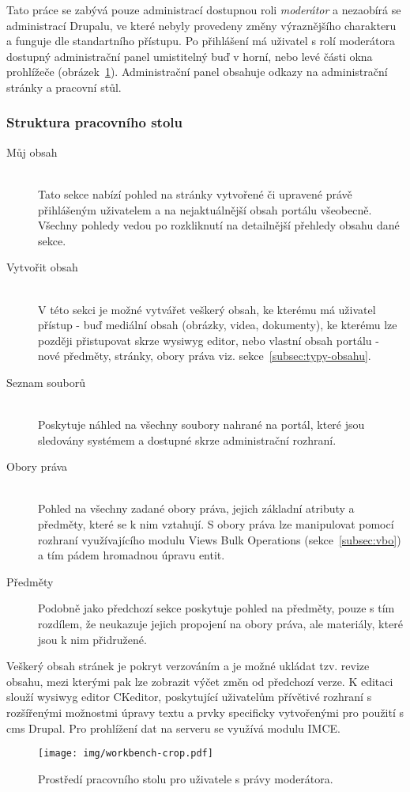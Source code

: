 Tato práce se zabývá pouze administrací dostupnou roli \emph{moderátor} a nezaobírá se administrací Drupalu, ve které nebyly provedeny změny výraznějšího charakteru a funguje dle standartního přístupu. Po přihlášení má uživatel s rolí moderátora dostupný administrační panel umistitelný buď v horní, nebo levé části okna prohlížeče (obrázek~\ref{fig:workbench}). Administrační panel obsahuje odkazy na administrační stránky a pracovní stůl. 

\subsubsection*{Struktura pracovního stolu}
\begin{description}
  \item[Můj obsah] \hfill \\
  Tato sekce nabízí pohled na stránky vytvořené či upravené právě přihlášeným uživatelem a na nejaktuálnější obsah portálu všeobecně. Všechny pohledy vedou po rozkliknutí na detailnější přehledy obsahu dané sekce.  
  \item [Vytvořit obsah] \hfill \\
  V této sekci je možné vytvářet veškerý obsah, ke kterému má uživatel přístup - buď mediální obsah (obrázky, videa, dokumenty), ke kterému lze později přistupovat skrze \gls{wysiwyg} editor, nebo vlastní obsah portálu - nové předměty, stránky, obory práva viz. sekce~\ref{subsec:typy-obsahu}.
  \item [Seznam souborů] \hfill \\
  Poskytuje náhled na všechny soubory nahrané na portál, které jsou sledovány systémem a dostupné skrze administrační rozhraní.
  \item [Obory práva] \hfill \\
  Pohled na všechny zadané obory práva, jejich základní atributy a předměty, které se k nim vztahují. S obory práva lze manipulovat pomocí rozhraní využívajícího modulu Views Bulk Operations (sekce~\ref{subsec:vbo}) a tím pádem hromadnou úpravu entit.
  \item [Předměty]
  Podobně jako předchozí sekce poskytuje pohled na předměty, pouze s tím rozdílem, že neukazuje jejich propojení na obory práva, ale materiály, které jsou k nim přidružené.
\end{description}

Veškerý obsah stránek je pokryt verzováním a je možné ukládat tzv. revize obsahu, mezi kterými pak lze zobrazit výčet změn od předchozí verze. K editaci slouží \gls{wysiwyg} editor CKeditor, poskytující uživatelům přívětivé rozhraní s rozšířenými možnostmi úpravy textu a prvky specificky vytvořenými pro použití s \gls{cms} Drupal. Pro prohlížení dat na serveru se využívá modulu IMCE.

\begin{figure}[htp]
  \texttt{[image: img/workbench-crop.pdf]}
  \caption{Prostředí pracovního stolu pro uživatele s právy moderátora.}
  \label{fig:workbench}
\end{figure}  
